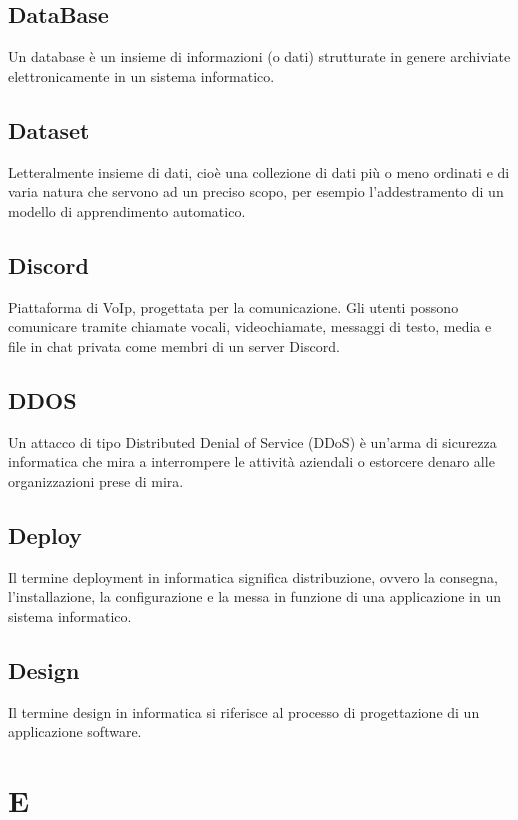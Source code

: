 \documentclass{classes/base}
\begin{document}
        \subsection*{DataBase}
        Un database è un insieme di informazioni (o dati) strutturate in genere archiviate elettronicamente in un sistema informatico.

        \subsection*{Dataset}
        Letteralmente insieme di dati, cioè una collezione di dati più o meno ordinati e di varia natura che servono ad un preciso scopo, per esempio l'addestramento di un modello di apprendimento automatico.
       
        \subsection*{Discord}
        Piattaforma di VoIp, progettata per la comunicazione. Gli utenti possono comunicare tramite chiamate vocali, videochiamate, messaggi di testo, media e file in chat privata come membri di un server Discord.

        \subsection*{DDOS}
        Un attacco di tipo Distributed Denial of Service (DDoS) è un'arma di sicurezza informatica che mira a interrompere le attività aziendali o estorcere denaro alle organizzazioni prese di mira.

        \subsection*{Deploy}
        Il termine deployment in informatica significa distribuzione, ovvero la consegna, l'installazione, la configurazione e la messa in funzione di una applicazione in un sistema informatico.

        \subsection*{Design}
        Il termine design in informatica si riferisce al processo di progettazione di un applicazione software.

        \newpage  
    \section{E}
    
\end{document}
